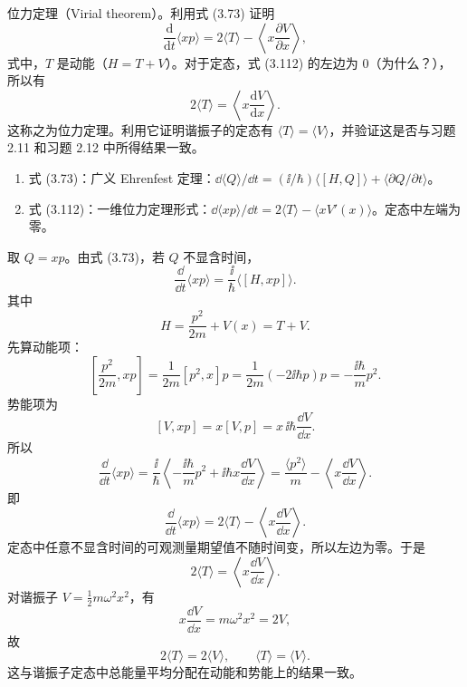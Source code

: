 \begin{question}
位力定理（Virial theorem）。利用式 (3.73) 证明
\[
\frac{\mathrm d}{\mathrm dt}\langle xp\rangle=2\langle T\rangle-\left\langle x\frac{\partial V}{\partial x}\right\rangle,
\tag{3.112}
\]
式中，$T$ 是动能（$H=T+V$）。对于定态，式 (3.112) 的左边为 0（为什么？），所以有
\[
2\langle T\rangle=\left\langle x\frac{\mathrm dV}{\mathrm dx}\right\rangle .
\tag{3.113}
\]
这称之为位力定理。利用它证明谐振子的定态有 $\langle T\rangle=\langle V\rangle$，并验证这是否与习题 2.11 和习题 2.12 中所得结果一致。

\par\smallskip
{}
\begin{enumerate}[leftmargin=2.2em,itemsep=0.12em,topsep=0.12em,parsep=0pt]
\item 式 (3.73)：广义 Ehrenfest 定理：$\dd\langle Q\rangle/\dd t=(\ii/\hbar)\langle[H,Q]\rangle+\langle\partial Q/\partial t\rangle$。
\item 式 (3.112)：一维位力定理形式：$\dd\langle xp\rangle/\dd t=2\langle T\rangle-\langle xV'(x)\rangle$。定态中左端为零。
\end{enumerate}

\end{question}
\begin{solution}
取 $Q=xp$。由式 (3.73)，若 $Q$ 不显含时间，
\[
\frac{\dd}{\dd t}\langle xp\rangle=\frac{\ii}{\hbar}\langle[H,xp]\rangle.
\]
其中
\[
H=\frac{p^2}{2m}+V(x)=T+V.
\]
先算动能项：
\[
\left[\frac{p^2}{2m},xp\right]
=\frac1{2m}[p^2,x]p
=\frac1{2m}(-2\ii\hbar p)p
=-\frac{\ii\hbar}{m}p^2.
\]
势能项为
\[
[V,xp]=x[V,p]=x\,\ii\hbar\frac{\dd V}{\dd x}.
\]
所以
\[
\frac{\dd}{\dd t}\langle xp\rangle
=\frac{\ii}{\hbar}\left\langle-\frac{\ii\hbar}{m}p^2
+\ii\hbar x\frac{\dd V}{\dd x}\right\rangle
=\frac{\langle p^2\rangle}{m}-\left\langle x\frac{\dd V}{\dd x}\right\rangle.
\]
即
\[
\boxed{\frac{\dd}{\dd t}\langle xp\rangle=2\langle T\rangle-\left\langle x\frac{\dd V}{\dd x}\right\rangle.}
\]
定态中任意不显含时间的可观测量期望值不随时间变，所以左边为零。于是
\[
2\langle T\rangle=\left\langle x\frac{\dd V}{\dd x}\right\rangle.
\]
对谐振子 $V=\frac12m\omega^2x^2$，有
\[
x\frac{\dd V}{\dd x}=m\omega^2x^2=2V,
\]
故
\[
2\langle T\rangle=2\langle V\rangle,
\qquad
\boxed{\langle T\rangle=\langle V\rangle.}
\]
这与谐振子定态中总能量平均分配在动能和势能上的结果一致。
\end{solution}

